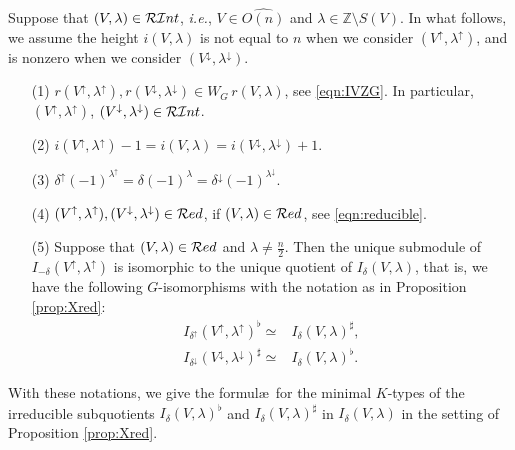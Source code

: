 \begin{proposition}
\label{prop:Vlmdup}
Suppose that $(V,\lambda) \in {\mathcal{RI}}nt$, 
 {\it{i.e.}}, 
 $V \in \widehat{O(n)}$
 and $\lambda \in {\mathbb{Z}} \setminus S(V)$.  
In what follows, 
 we assume the height $i(V,\lambda)$ is not equal to $n$
 when we consider $(V^{\uparrow}, \lambda^{\uparrow})$, 
 and is nonzero 
 when we consider $(V^{\downarrow}, \lambda^{\downarrow})$.  
\begin{enumerate}
\item[{\rm{(1)}}]
$r(V^{\uparrow},\lambda^{\uparrow}), 
r(V^{\downarrow},\lambda^{\downarrow})
\in W_G\, r(V,\lambda)$, 
 see \eqref{eqn:IVZG}.  
In particular,
 $(V^{\uparrow},\lambda^{\uparrow})$, 
 $(V^{\downarrow},\lambda^{\downarrow}) \in {\mathcal{RI}}nt$.  
\item[{\rm{(2)}}]
$i(V^{\uparrow}, \lambda^{\uparrow})-1=i(V, \lambda)
 =i(V^{\downarrow}, \lambda^{\downarrow})+1$.  
\item[{\rm{(3)}}]
$\delta^{\uparrow} (-1)^{\lambda^{\uparrow}}
=\delta (-1)^{\lambda}
=\delta^{\downarrow} (-1)^{\lambda^{\downarrow}}$. 
\item[{\rm{(4)}}]
$(V^{\uparrow}, \lambda^{\uparrow}),  
(V^{\downarrow}, \lambda^{\downarrow})\in {\mathcal{R}}ed$, 
 if $(V, \lambda) \in {\mathcal{R}}ed$,
 see \eqref{eqn:reducible}.  
\item[{\rm{(5)}}]
Suppose that $(V,\lambda) \in {\mathcal{R}}ed$
 and $\lambda \ne \frac n 2$.  
Then the unique submodule of $I_{-\delta}(V^{\uparrow}, \lambda^{\uparrow})$
 is isomorphic to the unique quotient
 of $I_{\delta}(V, \lambda)$, 
 that is, 
 we have the following $G$-isomorphisms
 with the notation 
 as in Proposition \ref{prop:Xred}:
\begin{align*}
  I_{\delta^{\uparrow}}(V^{\uparrow}, \lambda^{\uparrow})^{\flat}
  \simeq&
  I_{\delta}(V, \lambda)^{\sharp}, 
\\
  I_{\delta^{\downarrow}}(V^{\downarrow}, \lambda^{\downarrow})^{\sharp}
  \simeq&
  I_{\delta}(V, \lambda)^{\flat}.  
\end{align*}
\end{enumerate}
\end{proposition}

With these notations,
 we give the formul\ae\ for the minimal $K$-types
 of the irreducible subquotients 
 $I_{\delta}(V,\lambda)^{\flat}$ and $I_{\delta}(V,\lambda)^{\sharp}$
 in $I_{\delta}(V,\lambda)$
 in the setting of Proposition \ref{prop:Xred}.  

